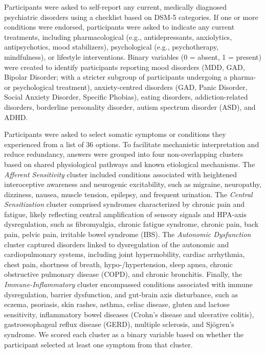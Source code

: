 \documentclass[
  jou,
  floatsintext,
  longtable,
  nolmodern,
  notxfonts,
  notimes,
  colorlinks=true,linkcolor=blue,citecolor=blue,urlcolor=blue]{apa7}
\begin{document}
Participants were asked to self-report any current, medically diagnosed
psychiatric disorders using a checklist based on DSM-5 categories. If
one or more conditions were endorsed, participants were asked to
indicate any current treatments, including pharmacological (e.g.,
antidepressants, anxiolytics, antipsychotics, mood stabilizers),
psychological (e.g., psychotherapy, mindfulness), or lifestyle
interventions. Binary variables (0 = absent, 1 = present) were created
to identify participants reporting mood disorders (MDD, GAD, Bipolar
Disorder; with a stricter subgroup of participants undergoing a pharma-
or psychological treatment), anxiety-centred disorders (GAD, Panic
Disorder, Social Anxiety Disorder, Specific Phobias), eating disorders,
addiction-related disorders, borderline personality disorder, autism
spectrum disorder (ASD), and ADHD.

Participants were asked to select somatic symptoms or conditions they
experienced from a list of 36 options. To facilitate mechanistic
interpretation and reduce redundancy, answers were grouped into four
non-overlapping clusters based on shared physiological pathways and
known etiological mechanisms. The \emph{Afferent Sensitivity} cluster
included conditions associated with heightened interoceptive awareness
and neurogenic excitability, such as migraine, neuropathy, dizziness,
nausea, muscle tension, epilepsy, and frequent urination. The
\emph{Central Sensitization} cluster comprised syndromes characterized
by chronic pain and fatigue, likely reflecting central amplification of
sensory signals and HPA-axis dysregulation, such as fibromyalgia,
chronic fatigue syndrome, chronic pain, back pain, pelvic pain,
irritable bowel syndrome (IBS). The \emph{Autonomic Dysfunction} cluster
captured disorders linked to dysregulation of the autonomic and
cardiopulmonary systems, including joint hypermobility, cardiac
arrhythmia, chest pain, shortness of breath, hypo-/hypertension, sleep
apnea, chronic obstructive pulmonary disease (COPD), and chronic
bronchitis. Finally, the \emph{Immune-Inflammatory} cluster encompassed
conditions associated with immune dysregulation, barrier dysfunction,
and gut-brain axis disturbance, such as eczema, psoriasis, skin rashes,
asthma, celiac disease, gluten and lactose sensitivity, inflammatory
bowel diseases (Crohn's disease and ulcerative colitis),
gastroesophageal reflux disease (GERD), multiple sclerosis, and
Sjögren's syndrome. We scored each cluster as a binary variable based on
whether the participant selected at least one symptom from that cluster.
\end{document}
